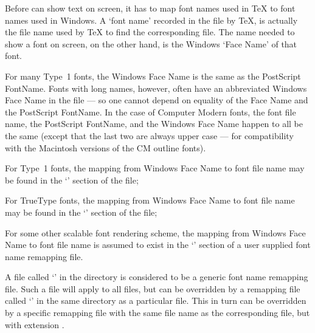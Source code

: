 
Before {\DVIWindo} can show text on screen, it has to map font names
used in {\TeX} to font names used in Windows.  
A `font name' recorded in the {\DVI} file by {\TeX}, is actually the
file name used by {\TeX} to find the corresponding {\TFM} file.  
The name needed to show a font on screen, on the other hand, 
is the Windows `Face Name' of that font.

For many Type~1 fonts, the Windows Face Name is the same as the
Post\-Script Font\-Name.  Fonts with long names, however, often
have an abbreviated Windows Face Name in the {\PFM} file --- so one
cannot depend on equality of the Face Name and the Post\-Script
Font\-Name.  In the case of Computer Modern fonts, the font file name,
the Post\-Script Font\-Name, and the Windows Face Name happen to all be
the same (except that the last two are always upper case --- for
compatibility with the Macintosh %
versions of the CM outline fonts).

\beginbullets

\bpar For Type~1 fonts, the mapping from Windows Face Name to font
file name may be found in the `\type{[Fonts]}' section of the {\ATMINI}
file;

\bpar For True\-Type fonts, the mapping from Windows Face Name to
font file name may be found in the `\type{[Fonts]}' section of the {\WININI}
file;

\bpar For some other scalable font rendering scheme, the mapping
from Windows Face Name to font file name is assumed to exist in the
`\type{[Fonts]}' section of a user supplied font name remapping file.

\endbullets

A file called `' in the {\DVIWindo} directory
is considered to be a generic font name remapping file.
Such a file will apply to all {\DVI} files, but can be overridden by a
remapping file called `' in the same directory as a
particular {\DVI} file. 
This in turn can be overridden by a specific remapping file with
the same file name as the corresponding {\DVI} file, 
but with extension .   %


